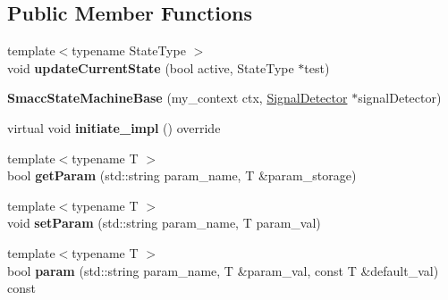 \subsection*{Public Member Functions}
\begin{DoxyCompactItemize}
\item 
{\footnotesize template$<$typename State\+Type $>$ }\\void {\bfseries update\+Current\+State} (bool active, State\+Type $\ast$test)\hypertarget{structsmacc_1_1SmaccStateMachineBase_a0a172afd49d485bbc4e008ccff410683}{}\label{structsmacc_1_1SmaccStateMachineBase_a0a172afd49d485bbc4e008ccff410683}

\item 
{\bfseries Smacc\+State\+Machine\+Base} (my\+\_\+context ctx, \hyperlink{classsmacc_1_1SignalDetector}{Signal\+Detector} $\ast$signal\+Detector)\hypertarget{structsmacc_1_1SmaccStateMachineBase_a47508a2d301007546d4c70dedd2ade4b}{}\label{structsmacc_1_1SmaccStateMachineBase_a47508a2d301007546d4c70dedd2ade4b}

\item 
virtual void {\bfseries initiate\+\_\+impl} () override\hypertarget{structsmacc_1_1SmaccStateMachineBase_a2dc1cd9a25b80f00602f1faab9b01e7b}{}\label{structsmacc_1_1SmaccStateMachineBase_a2dc1cd9a25b80f00602f1faab9b01e7b}

\item 
{\footnotesize template$<$typename T $>$ }\\bool {\bfseries get\+Param} (std\+::string param\+\_\+name, T \&param\+\_\+storage)\hypertarget{structsmacc_1_1SmaccStateMachineBase_a5529364d7f90edb802221536402e838a}{}\label{structsmacc_1_1SmaccStateMachineBase_a5529364d7f90edb802221536402e838a}

\item 
{\footnotesize template$<$typename T $>$ }\\void {\bfseries set\+Param} (std\+::string param\+\_\+name, T param\+\_\+val)\hypertarget{structsmacc_1_1SmaccStateMachineBase_a30d76661005a2bdff68c802cdab42fcf}{}\label{structsmacc_1_1SmaccStateMachineBase_a30d76661005a2bdff68c802cdab42fcf}

\item 
{\footnotesize template$<$typename T $>$ }\\bool {\bfseries param} (std\+::string param\+\_\+name, T \&param\+\_\+val, const T \&default\+\_\+val) const \hypertarget{structsmacc_1_1SmaccStateMachineBase_a9a074f2e5be33064796ad6df2d6231b7}{}\label{structsmacc_1_1SmaccStateMachineBase_a9a074f2e5be33064796ad6df2d6231b7}


\end{DoxyCompactItemize}
